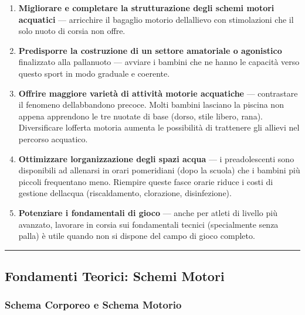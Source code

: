\documentclass[a4paper,11pt]{article}
\begin{document}
\begin{enumerate}
      \item
            \textbf{Migliorare e completare la strutturazione degli schemi motori
                  acquatici} --- arricchire il bagaglio motorio
            dell\textquotesingle allievo con stimolazioni che il solo nuoto di
            corsia non offre.
      \item
            \textbf{Predisporre la costruzione di un settore amatoriale o
                  agonistico} finalizzato alla pallanuoto --- avviare i bambini che ne
            hanno le capacità verso questo sport in modo graduale e coerente.
      \item
            \textbf{Offrire maggiore varietà di attività motorie acquatiche} ---
            contrastare il fenomeno dell\textquotesingle abbandono precoce. Molti
            bambini lasciano la piscina non appena apprendono le tre nuotate di
            base (dorso, stile libero, rana). Diversificare
            l\textquotesingle offerta motoria aumenta le possibilità di trattenere
            gli allievi nel percorso acquatico.
      \item
            \textbf{Ottimizzare l\textquotesingle organizzazione degli spazi
                  acqua} --- i preadolescenti sono disponibili ad allenarsi in orari
            pomeridiani (dopo la scuola) che i bambini più piccoli frequentano
            meno. Riempire queste fasce orarie riduce i costi di gestione
            dell\textquotesingle acqua (riscaldamento, clorazione, disinfezione).
      \item
            \textbf{Potenziare i fondamentali di gioco} --- anche per atleti di
            livello più avanzato, lavorare in corsia sui fondamentali tecnici
            (specialmente senza palla) è utile quando non si dispone del campo di
            gioco completo.
\end{enumerate}

\begin{center}\rule{0.5\linewidth}{0.5pt}\end{center}

\subsection{Fondamenti Teorici: Schemi
      Motori}\label{fondamenti-teorici-schemi-motori}

\subsubsection{Schema Corporeo e Schema
      Motorio}\label{schema-corporeo-e-schema-motorio}
\end{document}
